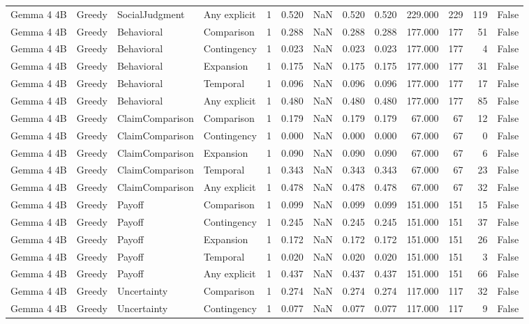 \begin{tabular}{llllrrrrrrrrr}
Gemma 4 4B & Greedy & SocialJudgment & Any explicit & 1 & 0.520 & NaN & 0.520 & 0.520 & 229.000 & 229 & 119 & False \\
Gemma 4 4B & Greedy & Behavioral & Comparison & 1 & 0.288 & NaN & 0.288 & 0.288 & 177.000 & 177 & 51 & False \\
Gemma 4 4B & Greedy & Behavioral & Contingency & 1 & 0.023 & NaN & 0.023 & 0.023 & 177.000 & 177 & 4 & False \\
Gemma 4 4B & Greedy & Behavioral & Expansion & 1 & 0.175 & NaN & 0.175 & 0.175 & 177.000 & 177 & 31 & False \\
Gemma 4 4B & Greedy & Behavioral & Temporal & 1 & 0.096 & NaN & 0.096 & 0.096 & 177.000 & 177 & 17 & False \\
Gemma 4 4B & Greedy & Behavioral & Any explicit & 1 & 0.480 & NaN & 0.480 & 0.480 & 177.000 & 177 & 85 & False \\
Gemma 4 4B & Greedy & ClaimComparison & Comparison & 1 & 0.179 & NaN & 0.179 & 0.179 & 67.000 & 67 & 12 & False \\
Gemma 4 4B & Greedy & ClaimComparison & Contingency & 1 & 0.000 & NaN & 0.000 & 0.000 & 67.000 & 67 & 0 & False \\
Gemma 4 4B & Greedy & ClaimComparison & Expansion & 1 & 0.090 & NaN & 0.090 & 0.090 & 67.000 & 67 & 6 & False \\
Gemma 4 4B & Greedy & ClaimComparison & Temporal & 1 & 0.343 & NaN & 0.343 & 0.343 & 67.000 & 67 & 23 & False \\
Gemma 4 4B & Greedy & ClaimComparison & Any explicit & 1 & 0.478 & NaN & 0.478 & 0.478 & 67.000 & 67 & 32 & False \\
Gemma 4 4B & Greedy & Payoff & Comparison & 1 & 0.099 & NaN & 0.099 & 0.099 & 151.000 & 151 & 15 & False \\
Gemma 4 4B & Greedy & Payoff & Contingency & 1 & 0.245 & NaN & 0.245 & 0.245 & 151.000 & 151 & 37 & False \\
Gemma 4 4B & Greedy & Payoff & Expansion & 1 & 0.172 & NaN & 0.172 & 0.172 & 151.000 & 151 & 26 & False \\
Gemma 4 4B & Greedy & Payoff & Temporal & 1 & 0.020 & NaN & 0.020 & 0.020 & 151.000 & 151 & 3 & False \\
Gemma 4 4B & Greedy & Payoff & Any explicit & 1 & 0.437 & NaN & 0.437 & 0.437 & 151.000 & 151 & 66 & False \\
Gemma 4 4B & Greedy & Uncertainty & Comparison & 1 & 0.274 & NaN & 0.274 & 0.274 & 117.000 & 117 & 32 & False \\
Gemma 4 4B & Greedy & Uncertainty & Contingency & 1 & 0.077 & NaN & 0.077 & 0.077 & 117.000 & 117 & 9 & False \\

\end{tabular}
